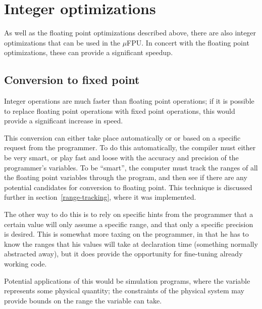 %

\section{Integer optimizations}

As well as the floating point optimizations described above, there are
also integer optimizations that can be used in the $\mu$FPU.  In concert
with the floating point optimizations, these can provide a significant
speedup.  

\subsection{Conversion to fixed point}

Integer operations are much faster than floating point operations; if it is
possible to replace floating point operations with fixed point operations,
this would provide a significant increase in speed.

This conversion can either take place automatically or or based on a
specific request from the programmer.  To do this automatically, the
compiler must either be very smart, or play fast and loose with the accuracy
and precision of the programmer's variables.  To be ``smart'', the computer
must track the ranges of all the floating point variables through the
program, and then see if there are any potential candidates for conversion
to floating point.  This technique is discussed further in
section~\ref{range-tracking}, where it was implemented.

The other way to do this is to rely on specific hints from the programmer
that a certain value will only assume a specific range, and that only a
specific precision is desired.  This is somewhat more taxing on the
programmer, in that he has to know the ranges that his values will take at
declaration time (something normally abstracted away), but it does provide
the opportunity for fine-tuning already working code.

Potential applications of this would be simulation programs, where the
variable represents some physical quantity; the constraints of the physical
system may provide bounds on the range the variable can take.
